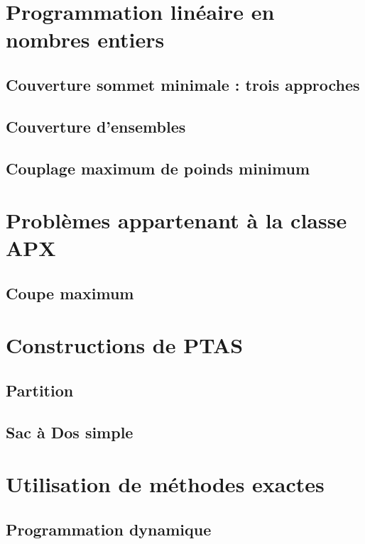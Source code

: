 \section{Programmation linéaire en nombres entiers}

\subsection{Couverture sommet minimale : trois approches}


\subsection{Couverture d'ensembles}


\subsection{Couplage maximum de poinds minimum}


\section{Problèmes appartenant à la classe APX}

\subsection{Coupe maximum}


\section{Constructions de PTAS}

\subsection{Partition}


\subsection{Sac à Dos simple}


\section{Utilisation de méthodes exactes}

\subsection{Programmation dynamique}


